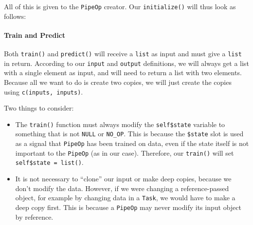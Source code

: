 \documentclass[]{article}
\newenvironment{Shaded}{}{}
\newcommand{\CommentTok}[1]{\textcolor[rgb]{0.00,0.50,0.00}{#1}}
\newcommand{\ControlFlowTok}[1]{\textcolor[rgb]{0.00,0.00,1.00}{#1}}
\newcommand{\DataTypeTok}[1]{#1}
\newcommand{\KeywordTok}[1]{\textcolor[rgb]{0.00,0.00,1.00}{#1}}
\newcommand{\NormalTok}[1]{#1}
\newcommand{\OperatorTok}[1]{#1}
\newcommand{\StringTok}[1]{\textcolor[rgb]{0.00,0.50,0.50}{#1}}
\let\oldparagraph\paragraph
\renewcommand{\paragraph}[1]{\oldparagraph{#1}\mbox{}}
\renewenvironment{Shaded} {\begin{snugshade}\small} {\end{snugshade}}
\begin{document}
All of this is given to the \texttt{PipeOp} creator. Our \texttt{initialize()} will thus look as follows:

\begin{Shaded}
\end{Shaded}

\hypertarget{train-and-predict}{%
\paragraph{Train and Predict}\label{train-and-predict}}

Both \texttt{train()} and \texttt{predict()} will receive a \texttt{list} as input and must give a \texttt{list} in return.
According to our \texttt{input} and \texttt{output} definitions, we will always get a list with a single element as input, and will need to return a list with two elements. Because all we want to do is create two copies, we will just create the copies using \texttt{c(inputs,\ inputs)}.

Two things to consider:

\begin{itemize}
\item
  The \texttt{train()} function must always modify the \texttt{self\$state} variable to something that is not \texttt{NULL} or \texttt{NO\_OP}.
  This is because the \texttt{\$state} slot is used as a signal that \texttt{PipeOp} has been trained on data, even if the state itself is not important to the \texttt{PipeOp} (as in our case).
  Therefore, our \texttt{train()} will set \texttt{self\$state\ =\ list()}.
\item
  It is not necessary to ``clone'' our input or make deep copies, because we don't modify the data.
  However, if we were changing a reference-passed object, for example by changing data in a \texttt{Task}, we would have to make a deep copy first.
  This is because a \texttt{PipeOp} may never modify its input object by reference.
\end{itemize}
\end{document}
